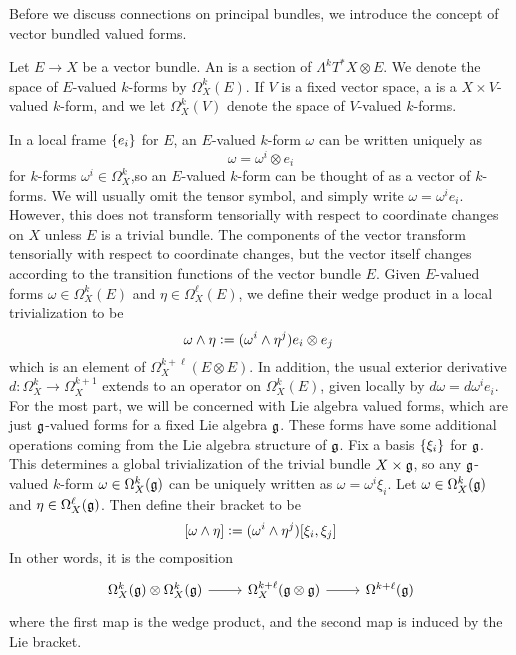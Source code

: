 Before we discuss connections on principal bundles, we introduce the concept of
vector bundled valued forms.
%
\begin{defn}
Let $E \to X$ be a vector bundle. An  is
a section of $\Lambda^kT^*X\otimes E$. We denote the space of $E$-valued $k$-forms
by $\Omega^k_X(E)$. If $V$ is a fixed vector space, a  is a $X\times V$-valued $k$-form, and we let $\Omega^k_X(V)$ denote the
space of $V$-valued $k$-forms.
\end{defn}
%
In a local frame $\left\lbrace e_i \right\rbrace$ for $E$, an $E$-valued $k$-form $\omega$ can be
written uniquely as
\[
\omega = \omega^i \otimes e_i
\]
for $k$-forms $\omega^i \in \Omega^k_X$,so an $E$-valued $k$-form can be thought of
as a vector of $k$-forms. We will usually omit the tensor symbol, and simply
write $\omega = \omega^ie_i$. However, this does not transform tensorially with
respect to coordinate changes on $X$ unless $E$ is a trivial bundle. The
components of the vector transform tensorially with respect to coordinate changes,
but the vector itself changes according to the transition functions of the vector
bundle $E$. Given $E$-valued forms $\omega \in \Omega^k_X(E)$ and
$\eta \in \Omega^\ell_X(E)$, we define their wedge product in a local trivialization to
be
\[
\omega \wedge \eta \vcentcolon=  (\omega^i \wedge \eta^j)e_i \otimes e_j\
\]
which is an element of $\Omega^{k+\ell}_X(E \otimes E)$. In addition, the usual
exterior derivative $d : \Omega^k_X \to \Omega^{k+1}_X$ extends to an operator on
$\Omega^k_X(E)$, given locally by $d\omega = d\omega^ie_i$. \\

For the most part, we will be concerned with Lie algebra valued forms,
which are just $\mathfrak{g}$-valued forms for a fixed Lie algebra $\mathfrak{g}$. These
forms have some additional operations coming from the Lie algebra structure
of $\mathfrak{g}$. Fix a basis $\left\lbrace \xi_i \right\rbrace$ for $\mathfrak{g}$. This determines a global
trivialization of the trivial bundle $X \times \mathfrak{g}$, so any $\mathfrak{g}$-valued
$k$-form $\omega \in \Omega^k_X(\mathfrak{g})$ can be uniquely written as
$\omega = \omega^i\xi_i$. Let
$\omega \in \Omega^k_X(\mathfrak{g})$ and $\eta \in \Omega^\ell_X(\mathfrak{g})$. Then define their
bracket to be
\[
[\omega\wedge\eta] \vcentcolon= (\omega^i \wedge \eta^j)[\xi_i,\xi_j]
\]
In other words, it is the composition
\[\begin{tikzcd}
\Omega^k_X(\g) \otimes \Omega^k_X(\g) \ar[r] & \Omega^{k+\ell}_X(\g \otimes \g) \ar[r] &
\Omega^{k+\ell}(\g)
\end{tikzcd}\]
where the first map is the wedge product, and the second map is induced by the
Lie bracket. \\

